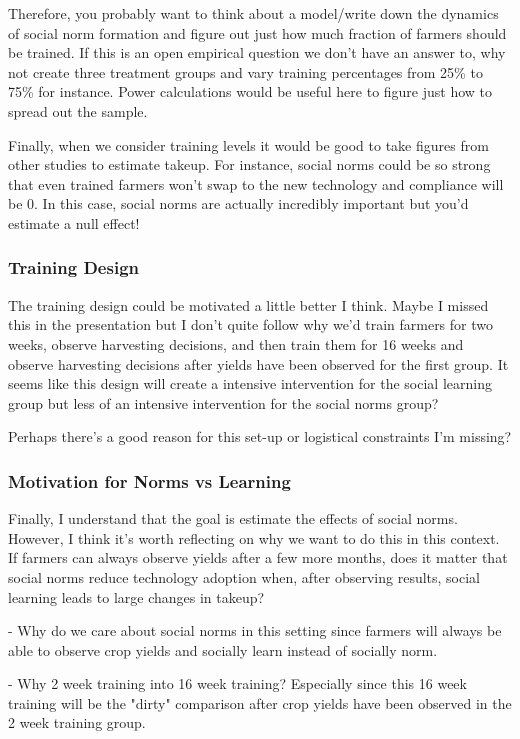 \documentclass{article}
\begin{document}
Therefore, you probably want to think about a model/write down the dynamics of
social norm formation and figure out just how much fraction of farmers should 
be trained. If this is an open empirical question we don't have an answer to, 
why not create three treatment groups and vary training percentages from 25\% to 
75\% for instance. Power calculations would be useful here to figure just how 
to spread out the sample.



Finally, when we consider training levels it would be good to take figures from 
other studies to estimate takeup. For instance, social norms could be so strong 
that even trained farmers won't swap to the new technology and compliance will be 0. In this 
case, social norms are actually incredibly important but you'd estimate a null 
effect!




\subsubsection*{Training Design}

The training design could be motivated a little better I think. Maybe I missed 
this in the presentation but I don't quite follow why we'd train farmers for two 
weeks, observe harvesting decisions, and then train them for 16 weeks and observe 
harvesting decisions after yields have been observed for the first group. It 
seems like this design will create a intensive intervention for the social 
learning group but less of an intensive intervention for the social norms 
group?


Perhaps there's a good reason for this set-up or logistical constraints I'm missing?



\subsubsection*{Motivation for Norms vs Learning}
Finally, I understand that the goal is estimate the effects of social norms. However,
I think it's worth reflecting on why we want to do this in this context. If farmers 
can always observe yields after a few more months, does it matter that social norms
reduce technology adoption when, after observing results, social learning leads to 
large changes in takeup?



- Why do we care about social norms in this setting since farmers will always be 
able to observe crop yields and socially learn instead of socially norm. 

- Why 2 week training into 16 week training? Especially since this 16 week 
training will be the "dirty" comparison after crop yields have been observed in 
the 2 week training group.
    
\end{document}
